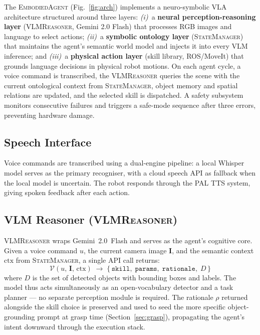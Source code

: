 \documentclass[twocolumn,10pt]{article}
\newcommand{\SM}{\textsc{StateManager}}
\newcommand{\VLM}{\textsc{VLMReasoner}}
\begin{document}
The \textsc{EmbodiedAgent} (Fig.~\ref{fig:arch}) implements a neuro-symbolic
VLA architecture structured around three layers:
\textit{(i)}~a \textbf{neural perception-reasoning layer} (\VLM, Gemini 2.0 Flash)
that processes RGB images and language to select actions;
\textit{(ii)}~a \textbf{symbolic ontology layer} (\SM) that maintains the
agent's semantic world model and injects it into every VLM inference;
and \textit{(iii)}~a \textbf{physical action layer} (skill library, ROS/MoveIt)
that grounds language decisions in physical robot motions.
On each agent cycle, a voice command is transcribed, the \VLM{} queries the
scene with the current ontological context from \SM{}, object memory and
spatial relations are updated, and the selected skill is dispatched.
A safety subsystem monitors consecutive failures and triggers a safe-mode
sequence after three errors, preventing hardware damage.

\subsection{Speech Interface}
\label{sec:speech}

Voice commands are transcribed using a dual-engine pipeline: a local
Whisper model serves as the primary recogniser, with a cloud speech API
as fallback when the local model is uncertain.
The robot responds through the PAL TTS system, giving spoken feedback
after each action.

\subsection{VLM Reasoner (\VLM)}
\label{sec:vlm}

\VLM{} wraps Gemini~2.0~Flash and serves as the agent's cognitive core.
Given a voice command $u$, the current camera image $\mathbf{I}$, and the
semantic context $\text{ctx}$ from \SM{}, a single API call returns:
\begin{equation}
  \mathcal{V}(u,\,\mathbf{I},\,\text{ctx})
  \;\longrightarrow\;
  \bigl\{\,\texttt{skill},\;\texttt{params},\;\texttt{rationale},\;
            D\,\bigr\}
  \label{eq:vlm}
\end{equation}
where $D$ is the set of detected objects with bounding boxes and labels.
The model thus acts simultaneously as an open-vocabulary detector and a
task planner — no separate perception module is required.
The rationale $\rho$ returned alongside the skill choice is preserved and
used to seed the more specific object-grounding prompt at grasp time
(Section~\ref{sec:grasp}), propagating the agent's intent downward through
the execution stack.
\end{document}
